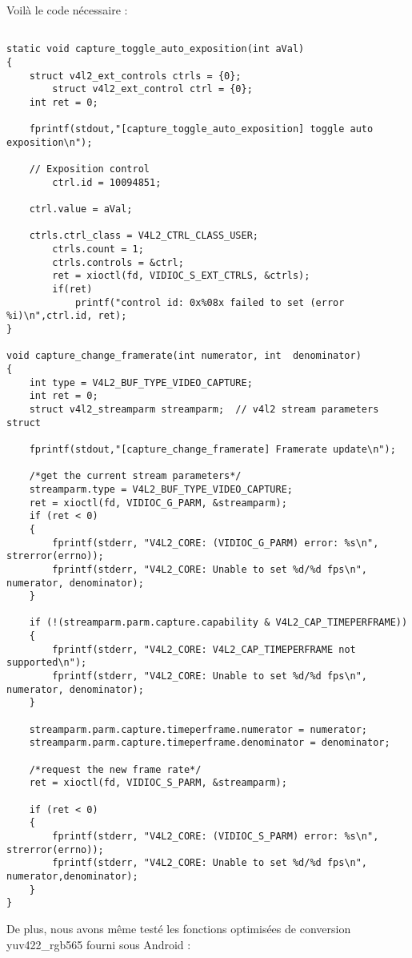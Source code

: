 \pagebreak Voilà le code nécessaire :
 
\begin{lstlisting}[frame=single,style=C]  % Start your code-block

static void capture_toggle_auto_exposition(int aVal)
{
	struct v4l2_ext_controls ctrls = {0};
        struct v4l2_ext_control ctrl = {0};
	int ret = 0;
	
	fprintf(stdout,"[capture_toggle_auto_exposition] toggle auto exposition\n");

	// Exposition control
        ctrl.id = 10094851;

	ctrl.value = aVal;

	ctrls.ctrl_class = V4L2_CTRL_CLASS_USER;
        ctrls.count = 1;
        ctrls.controls = &ctrl;
        ret = xioctl(fd, VIDIOC_S_EXT_CTRLS, &ctrls);
        if(ret)
            printf("control id: 0x%08x failed to set (error %i)\n",ctrl.id, ret);
}

void capture_change_framerate(int numerator, int  denominator)
{
	int type = V4L2_BUF_TYPE_VIDEO_CAPTURE;
	int ret = 0;
	struct v4l2_streamparm streamparm;  // v4l2 stream parameters struct

	fprintf(stdout,"[capture_change_framerate] Framerate update\n");

	/*get the current stream parameters*/
	streamparm.type = V4L2_BUF_TYPE_VIDEO_CAPTURE;
	ret = xioctl(fd, VIDIOC_G_PARM, &streamparm);
	if (ret < 0)
	{
		fprintf(stderr, "V4L2_CORE: (VIDIOC_G_PARM) error: %s\n", strerror(errno));
		fprintf(stderr, "V4L2_CORE: Unable to set %d/%d fps\n", numerator, denominator);
	}

	if (!(streamparm.parm.capture.capability & V4L2_CAP_TIMEPERFRAME))
	{
		fprintf(stderr, "V4L2_CORE: V4L2_CAP_TIMEPERFRAME not supported\n");
		fprintf(stderr, "V4L2_CORE: Unable to set %d/%d fps\n", numerator, denominator);
	}

	streamparm.parm.capture.timeperframe.numerator = numerator;
	streamparm.parm.capture.timeperframe.denominator = denominator;

	/*request the new frame rate*/
	ret = xioctl(fd, VIDIOC_S_PARM, &streamparm);

	if (ret < 0)
	{
		fprintf(stderr, "V4L2_CORE: (VIDIOC_S_PARM) error: %s\n", strerror(errno));
		fprintf(stderr, "V4L2_CORE: Unable to set %d/%d fps\n", numerator,denominator);
	}
}
\end{lstlisting}
 
\pagebreak 
De plus, nous avons même testé les fonctions optimisées de conversion yuv422\_rgb565 fourni sous Android :

